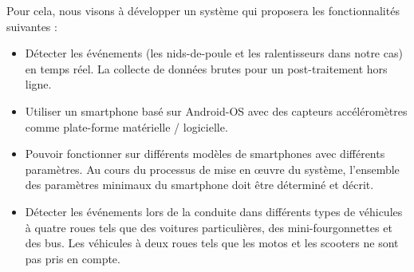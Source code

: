 Pour cela, nous visons à développer un système qui proposera les fonctionnalités suivantes :
\renewcommand{\labelitemi}{$\bullet$}
\begin{itemize}
  \item Détecter les événements (les nids-de-poule et les ralentisseurs dans notre cas) en temps réel. La collecte de données brutes pour un post-traitement hors ligne.
  \item Utiliser un smartphone basé sur Android-OS avec des capteurs accéléromètres comme plate-forme matérielle / logicielle.
  \item Pouvoir fonctionner sur différents modèles de smartphones avec différents paramètres. Au cours du processus de mise en œuvre du système, l'ensemble des paramètres minimaux du smartphone doit être déterminé et décrit.
  \item Détecter les événements lors de la conduite dans différents types de véhicules à quatre roues tels que des voitures particulières, des mini-fourgonnettes et des bus. Les véhicules à deux roues tels que les motos et les scooters ne sont pas pris en compte.
\end{itemize}


\renewcommand{\thesection}{\thechapter.\arabic{section}}














